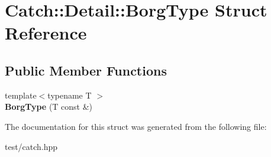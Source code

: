\hypertarget{structCatch_1_1Detail_1_1BorgType}{}\section{Catch\+:\+:Detail\+:\+:Borg\+Type Struct Reference}
\label{structCatch_1_1Detail_1_1BorgType}
\subsection*{Public Member Functions}
\begin{DoxyCompactItemize}
\item 
{\footnotesize template$<$typename T $>$ }\\{\bfseries Borg\+Type} (T const \&)\hypertarget{structCatch_1_1Detail_1_1BorgType_a780a9946ed0d654f0bfc043c8fc505d8}{}\label{structCatch_1_1Detail_1_1BorgType_a780a9946ed0d654f0bfc043c8fc505d8}

\end{DoxyCompactItemize}


The documentation for this struct was generated from the following file\+:\begin{DoxyCompactItemize}
\item 
test/catch.\+hpp\end{DoxyCompactItemize}

